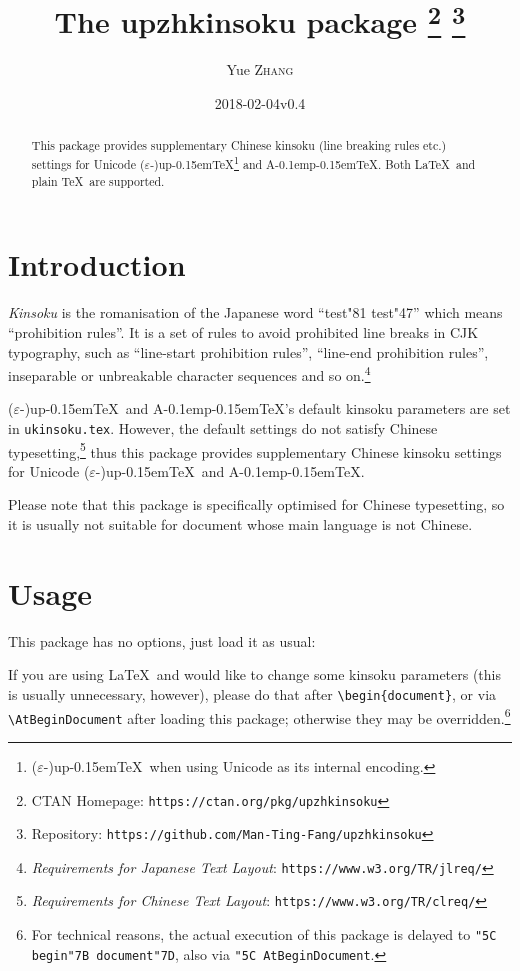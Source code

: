 \documentclass[a4paper]{article}
\newcommand\NormalSans{\normalfont\sffamily}
\newcommand\pkg[1]{{\protect\NormalSans#1}}
\newcommand\pTeX{p\kern-0.15em\TeX}
\newcommand\e{\ensuremath{\varepsilon}}
\newcommand\upTeX{u\pTeX}
\newcommand\ApTeX{A\kern-0.1em\pTeX}
\newcommand\kn{test}
\newcommand\sk{test}
\begin{document}
\title{The \pkg{upzhkinsoku} package%
  \thanks{CTAN Homepage: \texttt{https://ctan.org/pkg/upzhkinsoku}}
  \thanks{Repository: \texttt{https://github.com/Man-Ting-Fang/upzhkinsoku}}}
\author{Yue \textsc{Zhang}}
\date{2018-02-04\quad v0.4}

\maketitle

\begin{abstract}
This package provides supplementary Chinese kinsoku (line breaking rules etc.)
settings for Unicode (\e-)\upTeX\footnote{(\e-)\upTeX\ when using Unicode as its
internal encoding.} and \ApTeX. Both \LaTeX\ and plain \TeX\ are supported.
\end{abstract}

\section{Introduction}

\textit{Kinsoku} is the romanisation of the Japanese word ``{\kn\char"81\relax
\sk\char"47}'' which means ``prohibition rules''. It is a set of rules to avoid
prohibited line breaks in CJK typography, such as ``line-start prohibition
rules'', ``line-end prohibition rules'', inseparable or unbreakable character
sequences and so on.\footnote{\textit{Requirements for Japanese Text Layout}:
\texttt{https://www.w3.org/TR/jlreq/}}

(\e-)\upTeX\ and \ApTeX's default kinsoku parameters are set in
\verb|ukinsoku.tex|. However, the default settings do not satisfy Chinese
typesetting,\footnote{\textit{Requirements for Chinese Text Layout}:
\texttt{https://www.w3.org/TR/clreq/}} thus this package provides supplementary
Chinese kinsoku settings for Unicode (\e-)\upTeX\ and \ApTeX.

Please note that this package is specifically optimised for Chinese typesetting,
so it is usually not suitable for document whose main language is not Chinese.

\section{Usage}

This package has no options, just load it as usual:
If you are using \LaTeX\ and would like to change some kinsoku parameters (this
is usually unnecessary, however), please do that after \verb|\begin{document}|,
or via \verb|\AtBeginDocument| after loading this package; otherwise they may be
overridden.\footnote{For technical reasons, the actual execution of this package
is delayed to \texttt{\char"5C begin\char"7B document\char"7D}, also via
\texttt{\char"5C AtBeginDocument}.}
\end{document}
